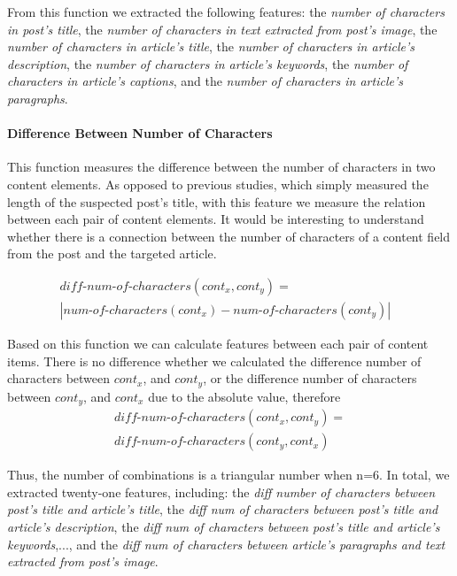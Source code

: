 \documentclass{sig-alternate}
\begin{document}
From this function we extracted the following features: the \emph{number of characters in post's title}, the \emph{number of characters in text extracted from post's image}, the \emph{number of characters in article's title}, the \emph{number of characters in article's description}, the \emph{number of characters in article's keywords}, the \emph{number of characters in article's captions}, and the \emph{number of characters in article's paragraphs}. 


\paragraph{Difference Between Number of Characters} 
\label{sec:diff_number_of_characters}
This function measures the difference between the number of characters in two content elements.
As opposed to previous studies, which simply measured the length of the suspected post's title, with this feature we measure the relation between each pair of content elements. 
It would be interesting to understand whether there is a connection between the number of characters of a content field from the post and the targeted article.   


	\begin{equation}
	\begin{aligned}
	diff\text{-}num\text{-}of\text{-}characters(cont_x,cont_y) ={} &  \\
	|num\text{-}of\text{-}characters(cont_x)-num\text{-}of\text{-}characters(cont_y)|&  
	\end{aligned}
	\end{equation}
	
	
	
Based on this function we can calculate features between each pair of content items.
There is no difference whether we calculated the difference number of characters between \(cont_x\), and \(cont_y\), or the difference number of characters between \(cont_y\), and \(cont_x\) due to the absolute value, therefore 
\begin{eqnarray*}
	diff\text{-}num\text{-}of\text{-}characters(cont_x,cont_y) = \\ 
	diff\text{-}num\text{-}of\text{-}characters(cont_y, cont_x) 
\end{eqnarray*} 

Thus, the number of combinations is a triangular number when n=6.
In total, we extracted twenty-one features, including: the \emph{diff number of characters between post's title and article's title},
the \emph{diff num of characters between post's title and article's description}, the \emph{diff num of characters between post's title and article's keywords},..., and the \emph{diff num of characters between article's paragraphs and text extracted from post's image}. 
\end{document}
